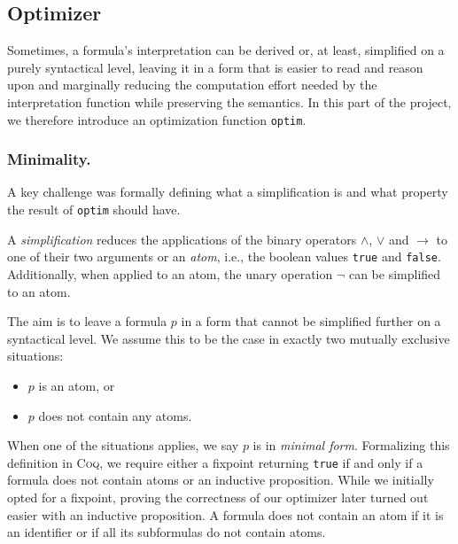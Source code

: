 \subsection{Optimizer}

Sometimes, a formula's interpretation can be derived or, at least, simplified on a purely syntactical level, leaving it in a form that is easier to read and reason upon and marginally reducing the computation effort needed by the interpretation function while preserving the semantics.
In this part of the project, we therefore introduce an optimization function \texttt{optim}.

\subsubsection{Minimality.}

A key challenge was formally defining what a simplification is and what property the result of \texttt{optim} should have.

A \emph{simplification} reduces the applications of the binary operators $\land$, $\lor$ and $\rightarrow$ to one of their two arguments or an \emph{atom}, i.e., the boolean values \texttt{true} and \texttt{false}. 
Additionally, when applied to an atom, the unary operation $\neg$ can be simplified to an atom.

The aim is to leave a formula $p$ in a form that cannot be simplified further on a syntactical level.
We assume this to be the case in exactly two mutually exclusive situations:
\begin{itemize}
    \item $p$ is an atom, or
    \item $p$ does not contain any atoms.
\end{itemize}
When one of the situations applies, we say $p$ is in \emph{minimal form}. Formalizing this definition in \textsc{Coq}, we require either a fixpoint returning \texttt{true} if and only if a formula does not contain atoms or an inductive proposition.
While we initially opted for a fixpoint, proving the correctness of our optimizer later turned out easier with an inductive proposition. 
A formula does not contain an atom if it is an identifier or if all its subformulas do not contain atoms.

